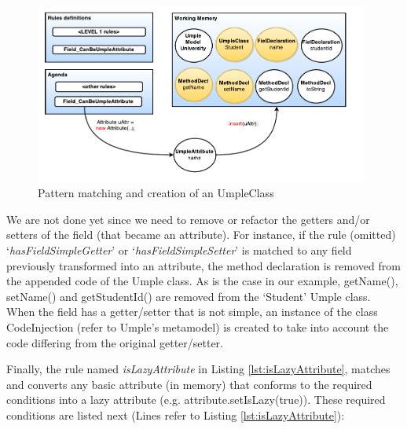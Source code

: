 \begin{figure}[h]
\centering
\includegraphics[width=0.98\textwidth]{Figures/ruleModel3.pdf}
\caption{Pattern matching and creation of an UmpleClass}
\label{fig:ruleModel3}
\end{figure}

We are not done yet since we need to remove or refactor the getters  and/or setters of the field (that became an attribute). For instance, if the rule (omitted) `\textit{hasFieldSimpleGetter}' or `\textit{hasFieldSimpleSetter}' is matched to any field previously transformed into an attribute, the method declaration is removed from the appended code of the Umple class. As is the case in our example, getName(), setName() and getStudentId() are removed from the `Student' Umple class.
When the field has a getter/setter that is not simple, an instance of the class CodeInjection (refer to Umple's metamodel) is created to take into account the code differing from the original getter/setter.

Finally, the rule named \textit{isLazyAttribute} in Listing \ref{lst:isLazyAttribute},  matches and converts any basic attribute (in memory) that conforms to the required conditions into a lazy attribute (e.g. attribute.setIsLazy(true)). These required conditions are listed next (Lines refer to Listing \ref{lst:isLazyAttribute}): 

